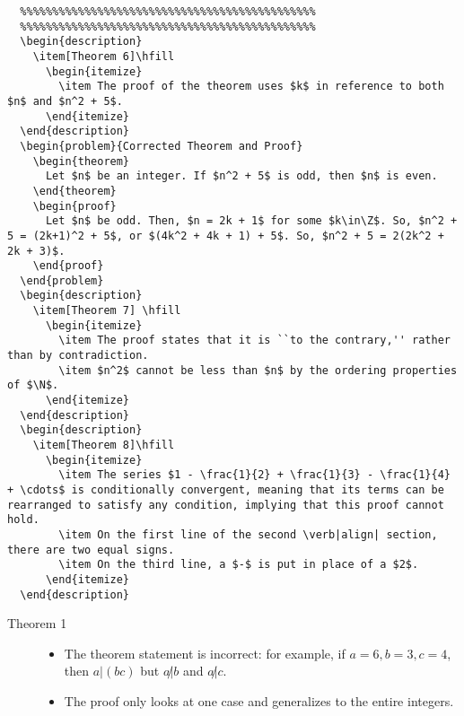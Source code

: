 \documentclass[9pt]{extarticle}
\newtheorem{theorem}{Theorem}
\newcommand{\N}{\mathbb{N}}
\newcommand{\Z}{\mathbb{Z}}
\begin{document}
\begin{lstlisting}
  %%%%%%%%%%%%%%%%%%%%%%%%%%%%%%%%%%%%%%%%%%%%%%
  %%%%%%%%%%%%%%%%%%%%%%%%%%%%%%%%%%%%%%%%%%%%%%
  \begin{description}
    \item[Theorem 6]\hfill
      \begin{itemize}
        \item The proof of the theorem uses $k$ in reference to both $n$ and $n^2 + 5$.
      \end{itemize}
  \end{description}
  \begin{problem}{Corrected Theorem and Proof}
    \begin{theorem}
      Let $n$ be an integer. If $n^2 + 5$ is odd, then $n$ is even.
    \end{theorem}
    \begin{proof}
      Let $n$ be odd. Then, $n = 2k + 1$ for some $k\in\Z$. So, $n^2 + 5 = (2k+1)^2 + 5$, or $(4k^2 + 4k + 1) + 5$. So, $n^2 + 5 = 2(2k^2 + 2k + 3)$.
    \end{proof}
  \end{problem}
  \begin{description}
    \item[Theorem 7] \hfill
      \begin{itemize}
        \item The proof states that it is ``to the contrary,'' rather than by contradiction.
        \item $n^2$ cannot be less than $n$ by the ordering properties of $\N$.
      \end{itemize}
  \end{description}
  \begin{description}
    \item[Theorem 8]\hfill
      \begin{itemize}
        \item The series $1 - \frac{1}{2} + \frac{1}{3} - \frac{1}{4} + \cdots$ is conditionally convergent, meaning that its terms can be rearranged to satisfy any condition, implying that this proof cannot hold.
        \item On the first line of the second \verb|align| section, there are two equal signs.
        \item On the third line, a $-$ is put in place of a $2$.
      \end{itemize}
  \end{description}
  \end{lstlisting}
  \begin{description}
    \item[Theorem 1] \hfill
      \begin{itemize}
        \item The theorem statement is incorrect: for example, if $a=6,b=3,c=4$, then $a|(bc)$ but $a\not| b$ and $a\not|c$.
        \item The proof only looks at one case and generalizes to the entire integers.
      \end{itemize}
  \end{description}
\end{document}
